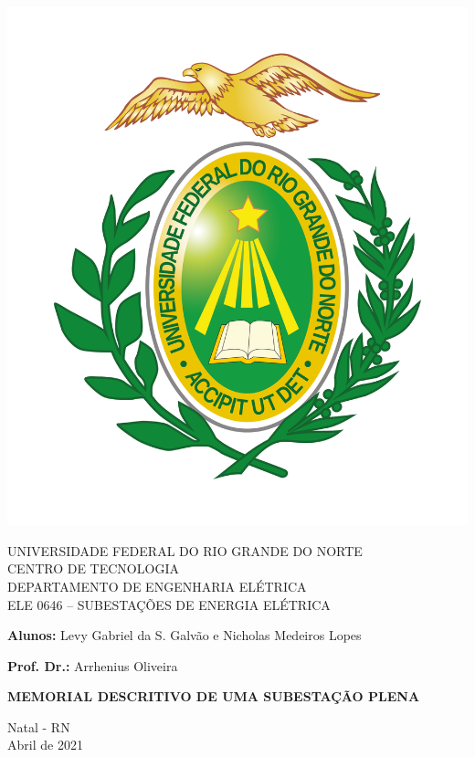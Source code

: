 \documentclass[12pt, a4paper, oneside]{article}
\begin{document}





\thispagestyle{empty}

\begin{center}
\begin{center}
    \includegraphics[width=0.2\linewidth]{Imagens/brasao_gradiente.png}
\end{center}


\begin{center}
    UNIVERSIDADE FEDERAL DO RIO GRANDE DO NORTE \\
    CENTRO DE TECNOLOGIA \\
    DEPARTAMENTO DE ENGENHARIA ELÉTRICA \\
    ELE 0646 – SUBESTAÇÕES DE ENERGIA ELÉTRICA \\
\end{center}

\vspace{2cm}


\begin{center}
    \large \textbf{Alunos:} Levy Gabriel da S. Galvão e Nicholas Medeiros Lopes
    
    
    \large \textbf{Prof. Dr.:} Arrhenius Oliveira
\end{center}

\vspace{4cm}


\textbf{\Large{MEMORIAL DESCRITIVO DE UMA SUBESTAÇÃO PLENA}}\\

\vspace{5cm}



\large Natal - RN \\
Abril de 2021
\end{center}








\thispagestyle{empty}
\newpage

\tableofcontents
\setcounter{page}{1}

\newpage


\end{document}
